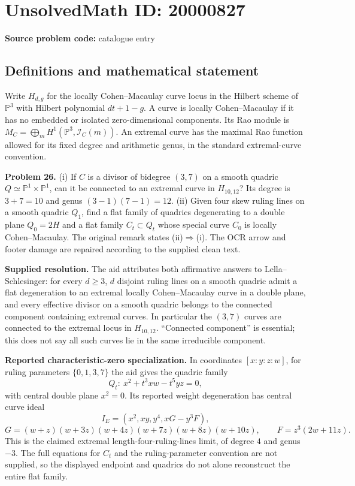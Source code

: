 \documentclass[11pt]{article}
\newcommand{\PP}{\mathbb{P}}
\begin{document}
\section*{UnsolvedMath ID: 20000827}
\textbf{Source problem code:} catalogue entry
\subsection{Definitions and mathematical statement}
Write $H_{d,g}$ for the locally Cohen--Macaulay curve locus in the Hilbert scheme of $\PP^3$ with Hilbert polynomial $dt+1-g$. A curve is locally Cohen--Macaulay if it has no embedded or isolated zero-dimensional components. Its Rao module is $M_C=\bigoplus_m H^1(\PP^3,\mathcal I_C(m))$. An extremal curve has the maximal Rao function allowed for its fixed degree and arithmetic genus, in the standard extremal-curve convention.

\textbf{Problem 26.} (i) If $C$ is a divisor of bidegree $(3,7)$ on a smooth quadric $Q\simeq\PP^1\times\PP^1$, can it be connected to an extremal curve in $H_{10,12}$? Its degree is $3+7=10$ and genus $(3-1)(7-1)=12$. (ii) Given four skew ruling lines on a smooth quadric $Q_1$, find a flat family of quadrics degenerating to a double plane $Q_0=2H$ and a flat family $C_t\subset Q_t$ whose special curve $C_0$ is locally Cohen--Macaulay. The original remark states (ii)$\Rightarrow$(i). The OCR arrow and footer damage are repaired according to the supplied clean text.

\textbf{Supplied resolution.} The aid attributes both affirmative answers to Lella--Schlesinger: for every $d\geq3$, $d$ disjoint ruling lines on a smooth quadric admit a flat degeneration to an extremal locally Cohen--Macaulay curve in a double plane, and every effective divisor on a smooth quadric belongs to the connected component containing extremal curves. In particular the $(3,7)$ curves are connected to the extremal locus in $H_{10,12}$. ``Connected component'' is essential; this does not say all such curves lie in the same irreducible component.

\textbf{Reported characteristic-zero specialization.} In coordinates $[x:y:z:w]$, for ruling parameters $\{0,1,3,7\}$ the aid gives the quadric family
\[
 Q_t:\ x^2+t^3xw-t^5yz=0,
\]
with central double plane $x^2=0$. Its reported weight degeneration has central curve ideal
\[
 I_E=(x^2,xy,y^4,xG-y^3F),
\]
\[
 G=(w+z)(w+3z)(w+4z)(w+7z)(w+8z)(w+10z),\qquad
 F=z^3(2w+11z).
\]
This is the claimed extremal length-four-ruling-lines limit, of degree $4$ and genus $-3$. The full equations for $C_t$ and the ruling-parameter convention are not supplied, so the displayed endpoint and quadrics do not alone reconstruct the entire flat family.
\end{document}
